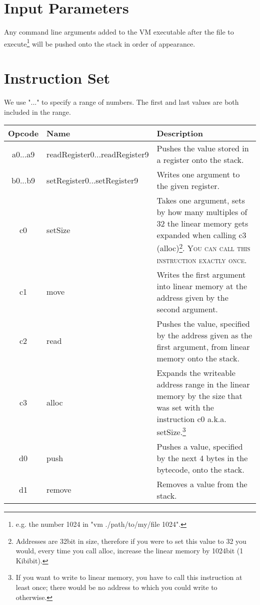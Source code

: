 \documentclass[10pt,a4paper]{article}
\begin{document}
	\section{Input Parameters}
	\label{input_parameters}
	Any command line arguments added to the VM executable after the file to execute\footnote{e.g. the number 1024 in "vm ./path/to/my/file 1024".} will be pushed onto the stack in order of appearance.
	
	\section{Instruction Set}
	\label{instruction_set}
	We use "..." to specify a range of numbers. The first and last values are both included in the range. \\
	\begin{longtable}[c]{c|l|p{9cm}}
		\hline
		Opcode & Name & Description \\
		\hline
		\hex a0...\hex a9 & readRegister0...readRegister9 & Pushes the value stored in a register onto the stack. \\
		\hline
		\hex b0...\hex b9 & setRegister0...setRegister9 & Writes one argument to the given register. \\
		\hline
		\hline
		\hex c0 & setSize & Takes one argument, sets by how many multiples of 32 the linear memory gets expanded when calling \hex c3 (alloc)\footnote{Addresses are 32bit in size, therefore if you were to set this value to 32 you would, every time you call alloc, increase the linear memory by 1024bit (1 Kibibit).}. \textsc{You can call this instruction exactly once.} \\
		\hline
		\hex c1 & move & Writes the first argument into linear memory at the address given by the second argument. \\
		\hline		
		\hex c2 & read & Pushes the value, specified by the address given as the first argument, from linear memory onto the stack. \\
		\hline
		\hex c3 & alloc & Expands the writeable address range in the linear memory by the size that was set with the instruction \hex c0 a.k.a. setSize.\footnote{If you want to write to linear memory, you have to call this instruction at least once; there would be no address to which you could write to otherwise.}\\
		\hline	
		\hline	
		\hex d0 & push & Pushes a value, specified by the next 4 bytes in the bytecode, onto the stack. \\
		\hline		
		\hex d1 & remove & Removes a value from the stack. \\

\end{longtable}
\end{document}
